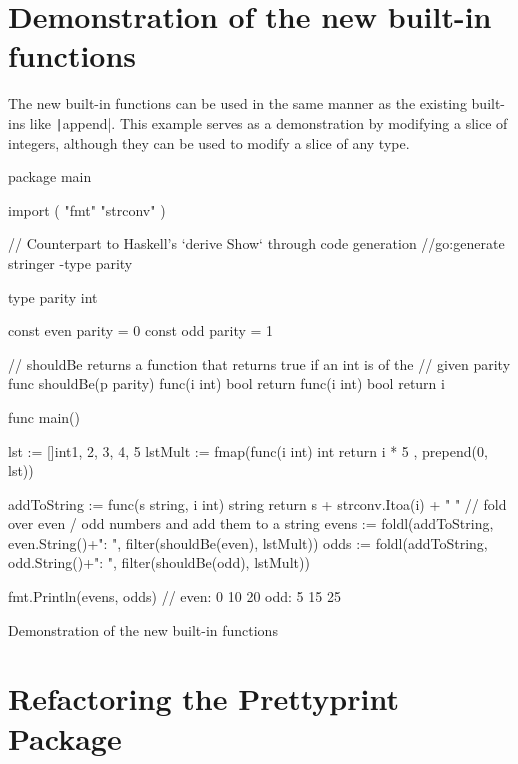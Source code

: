 
\section{Demonstration of the new built-in functions}

The new built-in functions can be used in the same manner as the existing built-ins like
\texttt|append|. This example serves as a demonstration by modifying a slice
of integers, although they can be used to modify a slice of any type.
\begin{code}
\begin{gocode}
package main

import (
	"fmt"
	"strconv"
)

// Counterpart to Haskell's `derive Show` through code generation
//go:generate stringer -type parity

type parity int

const even parity = 0
const odd parity = 1

// shouldBe returns a function that returns true if an int is of the
// given parity
func shouldBe(p parity) func(i int) bool {
	return func(i int) bool {
		return i%
	}
}

func main() {
	lst := []int{1, 2, 3, 4, 5}
	lstMult := fmap(func(i int) int { return i * 5 }, prepend(0, lst))

	addToString := func(s string, i int) string {
		return s + strconv.Itoa(i) + " "
	}
	// fold over even / odd numbers and add them to a string
	evens := foldl(addToString, even.String()+": ",
		filter(shouldBe(even), lstMult))
	odds := foldl(addToString, odd.String()+": ",
		filter(shouldBe(odd), lstMult))

	fmt.Println(evens, odds) // even: 0 10 20  odd: 5 15 25
}
\end{gocode}
\caption{Demonstration of the new built-in functions\label{code:funcexample}}
\end{code}

\section{Refactoring the Prettyprint Package}


